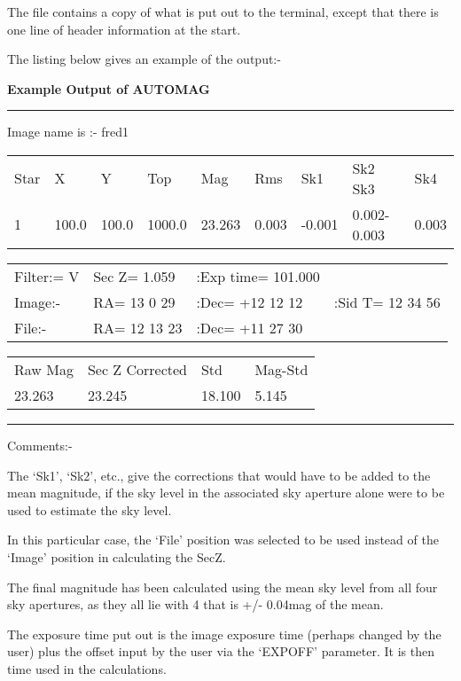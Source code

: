 {{{  The file contains a copy of what is put out to the terminal, except that 
  there is one line of header information at the start.

 The listing below gives an example of the output:-

 {\bf Example Output of AUTOMAG }

\rule{5in}{0.2mm}
 
\hspace{2ex} Image name is :-  fred{\undersc}1 \\
\hspace{3ex}\begin{tabular}{lllllllll}
   Star     &X      &Y        &Top     &Mag   &Rms    &Sk1   &Sk2 \hspace{3ex}  Sk3   &Sk4 \\
      1    &100.0  &100.0    &1000.0  &23.263 &0.003 &-0.001 &0.002-0.003 &0.003 \\
\end{tabular}


\hspace{3ex}\begin{tabular}{llll}
  Filter:= V &Sec Z= 1.059  &:Exp time= 101.000 & \\
  Image:-    &RA= 13  0 29  & :Dec= +12 12 12   &:Sid T= 12 34 56 \\
   File:-    &RA= 12 13 23  & :Dec= +11 27 30   & \\
\end{tabular}

\hspace{3ex}\begin{tabular}{llll}
  Raw Mag    & Sec Z Corrected    & Std    & Mag-Std \\
      23.263 &   23.245         & 18.100   & 5.145 \\
\end{tabular}

\rule{5in}{0.2mm}

  Comments:- 

\begin{list}{{-}}{}
    \item The `Sk1', `Sk2', etc., give the corrections that would have to be
      added to the mean magnitude, if the sky level in the associated
      sky aperture alone were to be used to estimate the sky level.
    \item  In this particular case, the `File' position was selected to be
      used instead of the `Image' position in calculating the SecZ.
    \item  The final magnitude has been calculated using the mean sky
      level from all four sky apertures, as they all lie with 4%
      that is +/- 0.04mag of the mean.
    \item  The exposure time put out is the image exposure time (perhaps
      changed by the user) plus the offset input by the user via the
      `EXPOFF' parameter. It is then time used in the calculations.
\end{list}

}}}
